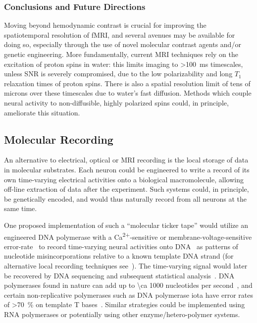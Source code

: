 \subsubsection{Conclusions and Future Directions}

Moving beyond hemodynamic contrast is crucial for improving the spatiotemporal resolution of fMRI, and several avenues may be available for doing so, especially through the use of novel molecular contrast agents and/or genetic engineering. 
More fundamentally, current MRI techniques rely on the excitation of proton spins in water: this limits imaging to \SI{>100}{\ms} timescales, unless SNR is severely compromised, due to the low polarizability and long $T_1$ relaxation times of proton spins.
There is also a spatial resolution limit of tens of microns over these timescales due to water's fast diffusion. Methods which couple neural activity to non-diffusible, highly polarized spins could, in principle, ameliorate this situation.

\subsection{Molecular Recording}

An alternative to electrical, optical or MRI recording is the local storage of data in molecular substrates.
Each neuron could be engineered to write a record of its own time-varying electrical activities onto a biological macromolecule, allowing off-line extraction of data after the experiment.
Such systems could, in principle, be genetically encoded, and would thus naturally record from all neurons at the same time.

One proposed implementation of such a ``molecular ticker tape'' would utilize an engineered DNA polymerase with a Ca\textsuperscript{2$+$}-sensitive or membrane-voltage-sensitive error-rate~\cite{zamft12} to record time-varying neural activities onto DNA~\cite{glaser13} as patterns of nucleotide misincorporations relative to a known template DNA strand (for alternative local recording techniques see~\cite{friedland09,bonnet13}).
The time-varying signal would later be recovered by DNA sequencing and subsequent statistical analysis~\cite{glaser13}.
DNA polymerases found in nature can add up to \num{\ca 1000} nucleotides per second~\cite{kelman95}, and certain non-replicative polymerases such as DNA polymerase iota have error rates of \SI{>70}{\percent} on template T bases~\cite{frank07}.
Similar strategies could be implemented using RNA polymerases or potentially using other enzyme/hetero-polymer systems.

